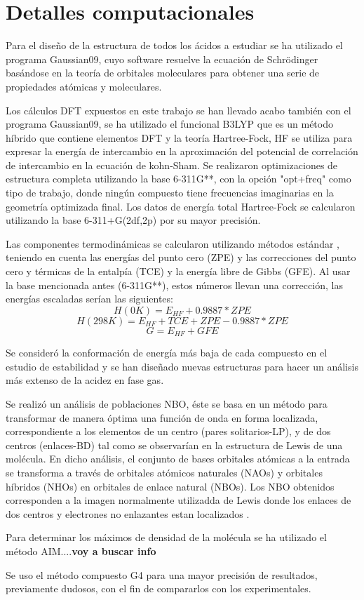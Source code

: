 \chapter{Detalles computacionales}

Para el diseño de la estructura de todos los ácidos a estudiar se ha utilizado el programa Gaussian09, cuyo software resuelve la ecuación de Schrödinger basándose en la teoría de orbitales moleculares para obtener una serie de propiedades atómicas y moleculares.

Los cálculos DFT expuestos en este trabajo se han llevado acabo también con el programa Gaussian09, se ha utilizado el funcional B3LYP que es un método híbrido que contiene elementos DFT y la teoría Hartree-Fock, HF se utiliza para expresar la energía de intercambio en la aproximación del potencial de correlación de intercambio en la ecuación de kohn-Sham. Se realizaron optimizaciones de estructura completa utilizando la base 6-311G**, con la opción "opt+freq" como tipo de trabajo, donde ningún compuesto tiene frecuencias imaginarias en la geometría optimizada final. Los datos de energía total Hartree-Fock se calcularon utilizando la base 6-311+G(2df,2p) por su mayor precisión.


Las componentes termodinámicas se calcularon utilizando métodos estándar \cite {quimica4}, teniendo en cuenta las energías del punto cero (ZPE) y las correcciones del punto cero y térmicas de la entalpía (TCE) y la energía libre de Gibbs (GFE). Al usar la base mencionada antes (6-311G**), estos números llevan una corrección, las energías escaladas serían las siguientes: \\
$$ H (0K) = E_{HF} + 0.9887*ZPE $$ 
$$ H (298K) = E_{HF} + TCE + ZPE - 0.9887*ZPE $$ 
$$G = E_{HF} + GFE $$

Se consideró la conformación de energía más baja de cada compuesto en el estudio de estabilidad y se han diseñado nuevas estructuras para hacer un análisis más extenso de la acidez en fase gas.

Se realizó un análisis de poblaciones NBO, éste se basa en un método para transformar de manera óptima una función de onda en forma localizada, correspondiente a los elementos de un centro (pares solitarios-LP), y de dos centros (enlaces-BD) tal como se observarían en la estructura de Lewis de una molécula. En dicho análisis, el conjunto de bases orbitales atómicas a la entrada se transforma a través de orbitales atómicos naturales (NAOs) y orbitales híbridos (NHOs) en orbitales de enlace natural (NBOs). Los NBO obtenidos corresponden a la imagen normalmente utilizadda de Lewis donde los enlaces de dos centros y electrones no enlazantes estan localizados \cite{quimica5}.

Para determinar los máximos de densidad de la molécula se ha utilizado el método AIM....{\bfseries voy a buscar info}

Se uso el método compuesto G4 para una mayor precisión de resultados, previamente dudosos, con el fin de compararlos con los experimentales.
 